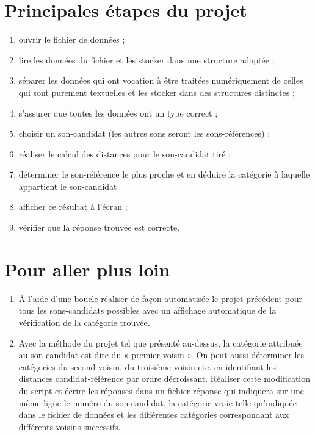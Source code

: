 \section{Principales étapes du projet}

\begin{enumerate}
 \item ouvrir le fichier de données ;
 \item lire les données du fichier et les stocker dans une structure adaptée ;
 \item séparer les données qui ont vocation à être traitées numériquement de celles qui sont purement textuelles et les stocker dans des structures distinctes ;
 \item s'assurer que toutes les données ont un type correct ;
 \item choisir un son-candidat (les autres sons seront les sons-références) ;
 \item réaliser le calcul des distances pour le son-candidat tiré ;
 \item déterminer le son-référence le plus proche et en déduire la catégorie à laquelle appartient le son-candidat 
 \item afficher ce résultat à l'écran ;
 \item vérifier que la réponse trouvée est correcte.
\end{enumerate}

\section{Pour aller plus loin}

\begin{enumerate}
 \item À l'aide d'une boucle réaliser de façon automatisée le projet précédent pour tous les sons-candidats possibles avec un affichage automatique de la vérification de la catégorie trouvée.
 \item Avec la méthode du projet tel que présenté au-dessus, la catégorie attribuée au son-candidat est dite du « premier voisin ». On peut aussi déterminer les catégories du second voisin, du troisième voisin etc. en identifiant les distances candidat-référence par ordre décroissant. Réaliser cette modification du script et écrire les réponses dans un fichier réponse qui indiquera sur une même ligne le numéro du son-candidat, la catégorie vraie telle qu'indiquée dans le fichier de données et les différentes catégories correspondant aux différents voisins successifs.
\end{enumerate}

